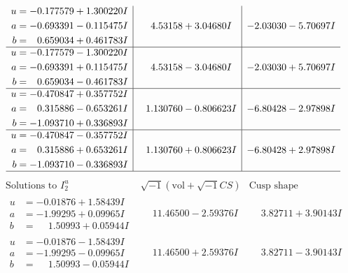 \documentclass[1p]{elsarticle_modified}
\theoremstyle{definition}
\newcommand{\I}{\sqrt{-1}}
\begin{document}
$$\begin{array}{c|c|c}
\begin{aligned}
u &= -0.177579 + 1.300220 I \\
a &= -0.693391 - 0.115475 I \\
b &= \phantom{-}0.659034 + 0.461783 I\end{aligned}
 & \phantom{-}4.53158 + 3.04680 I & -2.03030 - 5.70697 I \\ \hline\begin{aligned}
u &= -0.177579 - 1.300220 I \\
a &= -0.693391 + 0.115475 I \\
b &= \phantom{-}0.659034 - 0.461783 I\end{aligned}
 & \phantom{-}4.53158 - 3.04680 I & -2.03030 + 5.70697 I \\ \hline\begin{aligned}
u &= -0.470847 + 0.357752 I \\
a &= \phantom{-}0.315886 - 0.653261 I \\
b &= -1.093710 + 0.336893 I\end{aligned}
 & \phantom{-}1.130760 - 0.806623 I & -6.80428 - 2.97898 I \\ \hline\begin{aligned}
u &= -0.470847 - 0.357752 I \\
a &= \phantom{-}0.315886 + 0.653261 I \\
b &= -1.093710 - 0.336893 I\end{aligned}
 & \phantom{-}1.130760 + 0.806623 I & -6.80428 + 2.97898 I\\
 \hline 
 \end{array}$$\newpage$$\begin{array}{c|c|c}  
\text{Solutions to }I^u_{2}& \I (\text{vol} + \sqrt{-1}CS) & \text{Cusp shape}\\
 \hline 
\begin{aligned}
u &= -0.01876 + 1.58439 I \\
a &= -1.99295 + 0.09965 I \\
b &= \phantom{-}1.50993 + 0.05944 I\end{aligned}
 & \phantom{-}11.46500 - 2.59376 I & \phantom{-}3.82711 + 3.90143 I \\ \hline\begin{aligned}
u &= -0.01876 - 1.58439 I \\
a &= -1.99295 - 0.09965 I \\
b &= \phantom{-}1.50993 - 0.05944 I\end{aligned}
 & \phantom{-}11.46500 + 2.59376 I & \phantom{-}3.82711 - 3.90143 I \\ \hline\begin{aligned}

\end{aligned}
\end{array}$$
\end{document}
